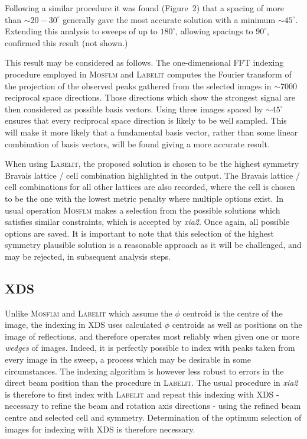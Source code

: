 \documentclass[preprint,pdf]{iucr}
\begin{document}
Following a similar procedure it was found
(Figure~2) that a 
spacing of more than $\sim 20 - 30^{\circ}$ generally gave the most accurate
solution with a minimum $\sim 45^{\circ}$. 
Extending this analysis to sweeps of up to $180^{\circ}$, allowing
spacings to $90^{\circ}$,
confirmed this result (not shown.) 

This result may be considered as follows. The one-dimensional FFT
indexing procedure employed in \textsc{Mosflm} and \textsc{Labelit} computes the
Fourier transform of the projection of the observed peaks gathered
from the selected images in $\sim
7000$ reciprocal space directions. Those directions which show the
strongest signal are then considered as possible basis vectors. Using
three images spaced by $\sim 45^{\circ}$ ensures that every reciprocal
space direction is likely to be well sampled. This will make it more likely
that a fundamental basis vector, rather than some linear combination
of basis vectors, will be found giving a more accurate result.

When using \textsc{Labelit}, the proposed solution is chosen to be the highest symmetry
Bravais lattice / cell combination highlighted in the output. The
Bravais lattice / cell combinations for all other lattices are also
recorded, where the cell is chosen to be the one with the lowest
metric penalty where multiple options exist. In usual operation \textsc{Mosflm}
makes a selection from the possible solutions which satisfies similar
constraints, which is accepted by \emph{xia2}. Once again, all possible
options are saved. It is important to note that this selection of the
highest symmetry plausible solution is a reasonable approach as it will be
challenged, and may be rejected, in subsequent analysis steps.

\subsection{XDS}

Unlike \textsc{Mosflm} and \textsc{Labelit} which assume the $\phi$ centroid is the
centre of the image, 
the indexing in XDS uses calculated $\phi$
centroids as well as positions on the image of reflections, and
therefore operates most reliably when given one or more \emph{wedges} of
images. Indeed, it is perfectly possible to index with peaks taken
from every image in the sweep, a process which may be desirable in some
circumstances. The indexing algorithm is however less robust to
errors in the direct beam position than the procedure in
\textsc{Labelit}. The usual procedure in \emph{xia2} is therefore to first
index with \textsc{Labelit} and repeat this indexing with XDS
 - necessary to refine the beam and rotation axis directions - 
using the refined beam centre and selected cell and symmetry. 
Determination of the optimum
selection of images for indexing with XDS is therefore necessary.
\end{document}
